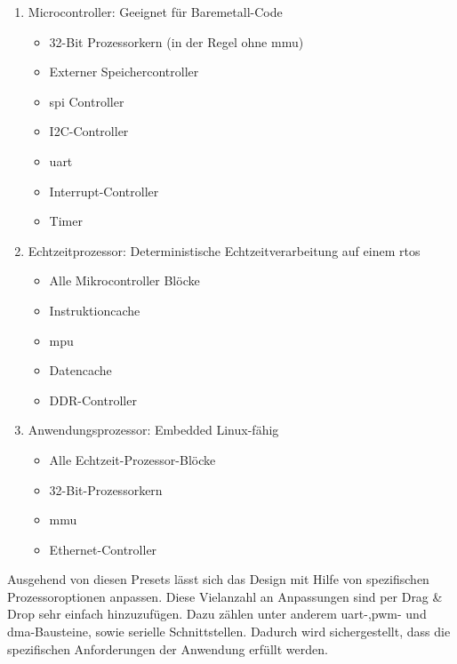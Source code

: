 \begin{enumerate}
  \item Microcontroller: Geeignet für Baremetall-Code
        \begin{itemize}
          \item 32-Bit Prozessorkern (in der Regel ohne \ac{mmu})
          \item Externer Speichercontroller
          \item \ac{spi} Controller
          \item I2C-Controller
          \item \ac{uart}
          \item Interrupt-Controller
          \item  Timer
        \end{itemize}
  \item Echtzeitprozessor: Deterministische Echtzeitverarbeitung auf einem \ac{rtos}
    \begin{itemize}
      \item Alle Mikrocontroller Blöcke
      \item Instruktioncache
      \item \ac{mpu}
      \item Datencache
      \item DDR-Controller
      \end{itemize}
  \item Anwendungsprozessor: Embedded Linux-fähig
        \begin{itemize}
          \item Alle Echtzeit-Prozessor-Blöcke
          \item 32-Bit-Prozessorkern
          \item \ac{mmu}
          \item Ethernet-Controller
        \end{itemize}
\end{enumerate}

Ausgehend von diesen Presets lässt sich das Design mit Hilfe von spezifischen Prozessoroptionen anpassen.
 Diese Vielanzahl an Anpassungen sind per Drag \& Drop sehr einfach hinzuzufügen. Dazu zählen unter anderem \ac{uart}-,\ac{pwm}- und \ac{dma}-Bausteine, sowie serielle Schnittstellen.
 Dadurch wird sichergestellt, dass die spezifischen Anforderungen der Anwendung erfüllt werden.

